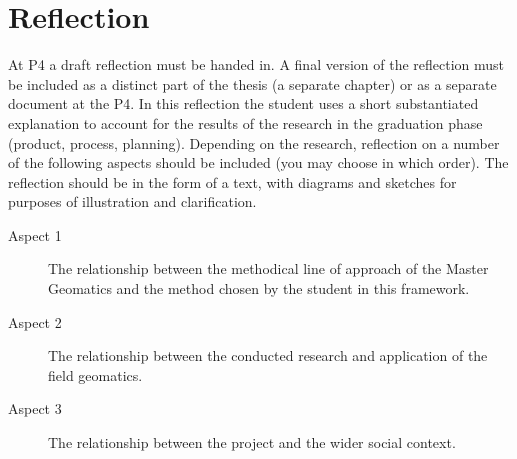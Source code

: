 
\chapter{Reflection}

At P4 a draft reflection must be handed in. A final version of the reflection must be included as a distinct part of the thesis (a separate chapter) or as a separate document at the P4.
In this reflection the student uses a short substantiated explanation to account for the results of the research in the graduation phase (product, process, planning).
Depending on the research, reflection on a number of the following aspects should be included (you may choose in which order). 
The reflection should be in the form of a text, with diagrams and sketches for purposes of illustration and clarification.

\begin{description}
  \item[Aspect 1] The relationship between the methodical line of approach of the Master Geomatics and  the method chosen by the student in this framework.  
  \item[Aspect 2] The relationship between the conducted research and application of the field  geomatics.
  \item[Aspect 3] The relationship between the project and the wider social context.
\end{description}

